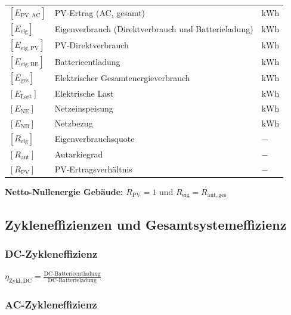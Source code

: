 \renewcommand{\arraystretch}{1.2}
\begin{tabular}{@{} l p{6.5cm} l @{}}
    $[E_\mathrm{PV,AC}]$   & PV-Ertrag (AC, gesamt) \dotfill & $\mathrm{kWh}$ \\
    $[E_\mathrm{eig}]$     & Eigenverbrauch (Direktverbrauch und Batterieladung) \dotfill & $\mathrm{kWh}$ \\
    $[E_\mathrm{eig,PV}]$  & PV-Direktverbrauch \dotfill & $\mathrm{kWh}$ \\
    $[E_\mathrm{eig,BE}]$  & Batterieentladung \dotfill & $\mathrm{kWh}$ \\
    $[E_\mathrm{ges}]$     & Elektrischer Gesamtenergieverbrauch \dotfill & $\mathrm{kWh}$ \\
    $[E_\mathrm{Last}]$    & Elektrische Last \dotfill & $\mathrm{kWh}$ \\
    $[E_\mathrm{NE}]$      & Netzeinspeisung \dotfill & $\mathrm{kWh}$ \\
    $[E_\mathrm{NB}]$      & Netzbezug \dotfill & $\mathrm{kWh}$ \\
    $[R_\mathrm{eig}]$     & Eigenverbrauchsquote \dotfill & $-$ \\
    $[R_\mathrm{aut}]$     & Autarkiegrad \dotfill & $-$ \\
    $[R_\mathrm{PV}]$      & PV-Ertragsverhältnis \dotfill & $-$ \\
\end{tabular}

\vspace{0.1cm}

\textbf{Netto-Nullenergie Gebäude:} $R_\mathrm{PV} = 1$ und $R_\mathrm{eig} = R_\mathrm{aut,ges}$


\subsection{Zykleneffizienzen und Gesamtsystemeffizienz}

\subsubsection{DC-Zykleneffizienz}

\vspace{0.1cm}

$
\boxed{
\eta_\mathrm{Zykl,DC} = \frac{\mathrm{DC\text{-}Batterieentladung}}{\mathrm{DC\text{-}Batterieladung}}
}
$

\subsubsection{AC-Zykleneffizienz}

